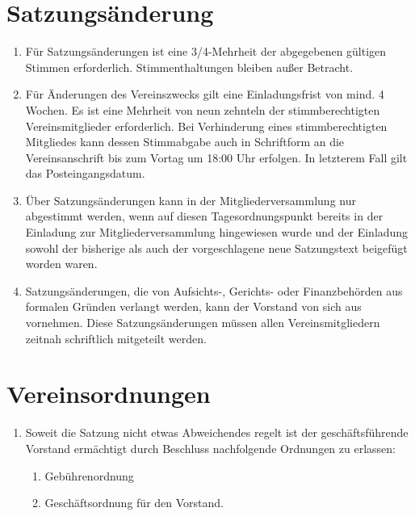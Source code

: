 \documentclass[a4paper,ngerman]{scrartcl}
\newcommand{\customref}[1]{\sectionref{#1}, Absatz \ref{#1}}
\begin{document}
\section{Satzungsänderung}
\begin{enumerate}
\item Für Satzungsänderungen ist eine 3/4-Mehrheit der abgegebenen gültigen Stimmen erforderlich. Stimmenthaltungen bleiben außer Betracht.
\item Für Änderungen des Vereinszwecks gilt eine Einladungsfrist von mind. 4 Wochen. Es ist eine Mehrheit von neun zehnteln der stimmberechtigten Vereinsmitglieder erforderlich. Bei Verhinderung eines stimmberechtigten Mitgliedes kann dessen Stimmabgabe auch in Schriftform an die Vereinsanschrift bis zum Vortag um 18:00 Uhr erfolgen. In letzterem Fall gilt das Posteingangsdatum. 
\item Über Satzungsänderungen kann in der Mitgliederversammlung nur abgestimmt werden, wenn auf diesen Tagesordnungspunkt bereits in der Einladung zur Mitgliederversammlung hingewiesen wurde und der Einladung sowohl der bisherige als auch der vorgeschlagene neue Satzungstext beigefügt worden waren.
\item Satzungsänderungen, die von Aufsichts-, Gerichts- oder Finanzbehörden aus formalen Gründen verlangt werden, kann der Vorstand von sich aus vornehmen. Diese Satzungsänderungen müssen allen Vereinsmitgliedern zeitnah schriftlich mitgeteilt werden.
\end{enumerate}

\section{Vereinsordnungen}
\begin{enumerate}
\item Soweit die Satzung nicht etwas Abweichendes regelt ist der geschäftsführende Vorstand ermächtigt durch Beschluss nachfolgende Ordnungen zu erlassen:
\begin{enumerate}
\item Gebührenordnung
\item Geschäftsordnung für den Vorstand.
\end{enumerate}
\end{enumerate}
\end{document}
